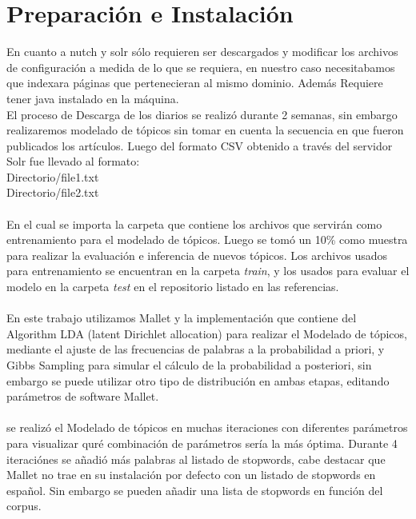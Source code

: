 \documentclass[8.5pt,twoside,twocolumn]{article}
\begin{document}
\section{Preparaci\'on e Instalaci\'on}


En cuanto a nutch y solr s\'olo requieren ser descargados y modificar los archivos de configuraci\'on  a medida de lo que se requiera, en nuestro caso necesitabamos que indexara p\'aginas que pertenecieran al mismo dominio. Adem\'as Requiere tener java instalado en la m\'aquina.
\\
El proceso de Descarga de los diarios se realiz\'o durante 2 semanas, sin embargo realizaremos modelado de t\'opicos sin tomar en cuenta la secuencia en que fueron publicados los art\'iculos. Luego del formato CSV obtenido a trav\'es del servidor Solr fue llevado al formato:
\\
Directorio/file1.txt \\
Directorio/file2.txt \\
\\
En el cual se importa la carpeta que contiene los archivos que servir\'an como
 entrenamiento para el modelado de t\'opicos. Luego se tom\'o un 10\% como muestra 
para realizar la evaluaci\'on e inferencia de nuevos t\'opicos. Los archivos usados 
para entrenamiento se encuentran en la carpeta \emph{train}, y los usados para evaluar el
modelo en la carpeta \emph{test} en el repositorio listado en las referencias.
\\
\\
En este trabajo utilizamos Mallet y la implementaci\'on que contiene del Algorithm LDA (latent Dirichlet allocation) para realizar el Modelado de t\'opicos, mediante el ajuste de las frecuencias de palabras  a la probabilidad a priori, y Gibbs Sampling para simular el c\'alculo de la probabilidad a posteriori, sin embargo se puede utilizar otro tipo de distribuci\'on en ambas etapas, editando par\'ametros de software Mallet. 
\\
\\
se realiz\'o el Modelado de t\'opicos en muchas iteraciones
 con diferentes par\'ametros para visualizar qur\'e combinaci\'on de 
par\'ametros ser\'ia la m\'as \'optima. Durante 4 iteraci\'ones se  a\~nadi\'o m\'as palabras al listado de stopwords, cabe destacar que Mallet no trae en su instalaci\'on por defecto con un listado de stopwords en espa\~nol. Sin embargo se pueden añadir una lista de stopwords en funci\'on del corpus.
\end{document}
